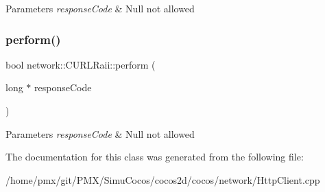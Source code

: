 \begin{DoxyParams}{Parameters}
{\em response\+Code} & Null not allowed \\
\hline
\end{DoxyParams}
\mbox{\label{classnetwork_1_1CURLRaii_a32715792d668e246aabfa9f8c1692465}} 
\subsubsection{\texorpdfstring{perform()}{perform()}\hspace{0.1cm}{\footnotesize\ttfamily [2/2]}}
{\footnotesize\ttfamily bool network\+::\+C\+U\+R\+L\+Raii\+::perform (\begin{DoxyParamCaption}\item[{long $\ast$}]{response\+Code }\end{DoxyParamCaption})\hspace{0.3cm}{\ttfamily [inline]}}


\begin{DoxyParams}{Parameters}
{\em response\+Code} & Null not allowed \\
\hline
\end{DoxyParams}


The documentation for this class was generated from the following file\+:\begin{DoxyCompactItemize}
\item 
/home/pmx/git/\+P\+M\+X/\+Simu\+Cocos/cocos2d/cocos/network/Http\+Client.\+cpp\end{DoxyCompactItemize}
